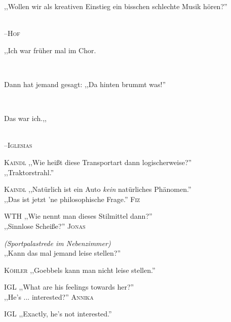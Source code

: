 \vspace{3mm}
{\raggedright ,,Wollen wir als kreativen Einstieg ein bisschen schlechte Musik hören?''}\\
\raggedleft \textsc{\footnotesize --\/Hof}\\

\vspace{3mm}
{\raggedright ,,Ich war früher mal im Chor.}\\
{\raggedright Dann hat jemand gesagt: ,,Da hinten brummt was!''}\\
{\raggedright Das war ich.,,}\\
\raggedleft \textsc{\footnotesize --\/Iglesias}\\

\vspace{3mm}
\hangindent=0.7cm
\raggedright \textsc{\footnotesize Kaindl} ,,Wie heißt diese Transportart dann logischerweise?''\\
\raggedleft ,,Traktorstrahl.'' \textsc{\footnotesize }\\

\vspace{3mm}
\hangindent=0.7cm
\raggedright \textsc{\footnotesize Kaindl} ,,Natürlich ist ein Auto \emph{kein} natürliches Phänomen.''\\
\raggedleft ,,Das ist jetzt 'ne philosophische Frage.'' \textsc{\footnotesize Fiz}\\

\vspace{3mm}
\hangindent=0.7cm
\raggedright \textsc{\footnotesize WTH} ,,Wie nennt man dieses Stilmittel dann?''\\
\raggedleft ,,Sinnlose Scheiße?'' \textsc{\footnotesize Jonas}\\

\vspace{3mm}
\raggedright \emph{\footnotesize (Sportpalastrede im Nebenzimmer)}\\
\raggedleft ,,Kann das mal jemand leise stellen?'' \textsc{\footnotesize  }\\
\hangindent=0.7cm
\raggedright \textsc{\footnotesize Köhler} ,,Goebbels kann man nicht leise stellen.''\\

\vspace{3mm}
\hangindent=0.7cm
\raggedright \textsc{\footnotesize IGL} ,,What are his feelings towards her?''\\
\raggedleft ,,He's ... interested?'' \textsc{\footnotesize Annika}\\
\hangindent=0.7cm
\raggedright \textsc{\footnotesize IGL} ,,Exactly, he's not interested.''\\

